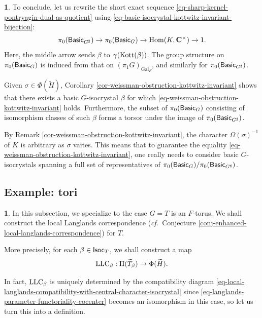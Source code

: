\documentclass[10pt,english,reqno]{amsart}
\newcommand{\complexes}{\mathbf C}
\newcommand{\Isoc}{\textnormal{\textsf{Isoc}}}
\newcommand{\Basic}{\textnormal{\textsf{Basic}}}
\newcommand{\Gal}{\operatorname{Gal}}
\newcommand{\Kottwitz}{\textnormal{Kott}}
\newcommand{\Hom}{\operatorname{Hom}}
\newcommand{\LLC}{\textnormal{LLC}}
\theoremstyle{definition}
\numberwithin{equation}{section}
\newtheorem{untitledsubsubsection}[subsubsection]{}
\newenvironment{void}
{\begin{untitledsubsubsection}}
{\end{untitledsubsubsection}}
\begin{document}
\begin{void}
\label{void-weissman-obstruction-vanishing-existence}
To conclude, let us rewrite the short exact sequence \eqref{eq-sharp-kernel-pontryagin-dual-as-quotient} using \eqref{eq-basic-isocrystal-kottwitz-invariant-bijection}:
$$
\pi_0(\Basic_{G^{\sharp}}) \rightarrow \pi_0(\Basic_G) \rightarrow \Hom(K, \complexes^{\times}) \rightarrow 1.
$$
Here, the middle arrow sends $\beta$ to $\gamma(\Kottwitz(\beta))$. The group structure on $\pi_0(\Basic_G)$ is induced from that on $(\pi_1G)_{\Gal_F}$, and similarly for $\pi_0(\Basic_{G^{\sharp}})$.

Given $\sigma \in \Phi(\widetilde H)$, Corollary \ref{cor-weissman-obstruction-kottwitz-invariant} shows that there exists a basic $G$-isocrystal $\beta$ for which \eqref{eq-weissman-obstruction-kottwitz-invariant} holds. Furthermore, the subset of $\pi_0(\Basic_G)$ consisting of isomorphism classes of such $\beta$ forms a torsor under the image of $\pi_0(\Basic_{G^{\sharp}})$.

By Remark \ref{cor-weissman-obstruction-kottwitz-invariant}, the character $\Omega(\sigma)^{-1}$ of $K$ is arbitrary as $\sigma$ varies. This means that to guarantee the equality \eqref{eq-weissman-obstruction-kottwitz-invariant}, one really needs to consider basic $G$-isocrystals spanning a full set of representatives of $\pi_0(\Basic_G)/\pi_0(\Basic_{G^{\sharp}})$.
\end{void}



\subsection{Example: tori}
\label{sec-example-tori}

\begin{void}
In this subsection, we specialize to the case $G = T$ is an $F$-torus. We shall construct the local Langlands correspondence (\emph{cf.}~Conjecture \ref{conj-enhanced-local-langlands-correspondence}) for $T$.

More precisely, for each $\beta \in \Isoc_T$, we shall construct a map
\begin{equation}
\label{eq-local-langlands-correspondence-tori-fixed-isocrystal}
\LLC_{\beta} : \Pi(\widetilde T_{\beta}) \rightarrow \Phi(\widetilde H).
\end{equation}

In fact, $\LLC_{\beta}$ is uniquely determined by the compatibility diagram \eqref{eq-local-langlands-compatibility-with-central-character-isocrystal} since \eqref{eq-langlands-parameter-functoriality-cocenter} becomes an isomorphism in this case, so let us turn this into a definition.
\end{void}
\end{document}
